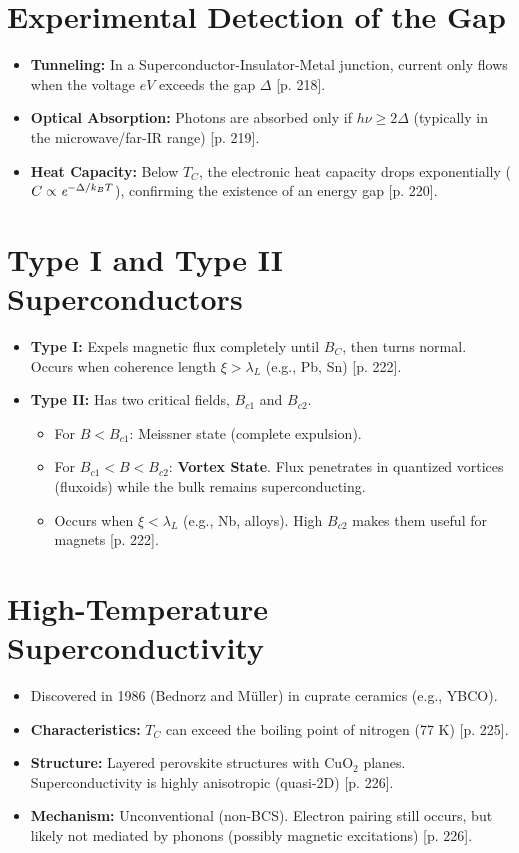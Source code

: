 \documentclass[a4paper,oneside,article]{memoir}
\begin{document}
\section{Experimental Detection of the Gap}
\begin{itemize}
    \item \textbf{Tunneling:} In a Superconductor-Insulator-Metal junction, current only flows when the voltage $eV$ exceeds the gap $\Delta$ [p. 218].
    \item \textbf{Optical Absorption:} Photons are absorbed only if $h\nu \ge 2\Delta$ (typically in the microwave/far-IR range) [p. 219].
    \item \textbf{Heat Capacity:} Below $T_C$, the electronic heat capacity drops exponentially ($C \propto \emph{e}^{-\Delta/k_B T}$), confirming the existence of an energy gap [p. 220].
\end{itemize}

\setcounter{section}{4}
\section{Type I and Type II Superconductors}
\begin{itemize}
    \item \textbf{Type I:} Expels magnetic flux completely until $B_C$, then turns normal. Occurs when coherence length $\xi > \lambda_L$ (e.g., Pb, Sn) [p. 222].
    \item \textbf{Type II:} Has two critical fields, $B_{c1}$ and $B_{c2}$.
    \begin{itemize}
        \item For $B < B_{c1}$: Meissner state (complete expulsion).
        \item For $B_{c1} < B < B_{c2}$: \textbf{Vortex State}. Flux penetrates in quantized vortices (fluxoids) while the bulk remains superconducting.
        \item Occurs when $\xi < \lambda_L$ (e.g., Nb, alloys). High $B_{c2}$ makes them useful for magnets [p. 222].
    \end{itemize}
\end{itemize}

\section{High-Temperature Superconductivity}
\begin{itemize}
    \item Discovered in 1986 (Bednorz and Müller) in cuprate ceramics (e.g., YBCO).
    \item \textbf{Characteristics:} $T_C$ can exceed the boiling point of nitrogen (77 K) [p. 225].
    \item \textbf{Structure:} Layered perovskite structures with CuO$_2$ planes. Superconductivity is highly anisotropic (quasi-2D) [p. 226].
    \item \textbf{Mechanism:} Unconventional (non-BCS). Electron pairing still occurs, but likely not mediated by phonons (possibly magnetic excitations) [p. 226].
\end{itemize}
\end{document}
